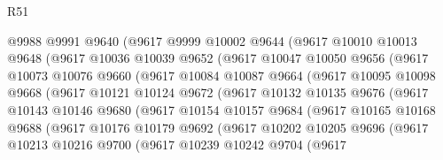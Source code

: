 \begin{lexlean}{R51}
\begin{coremodule}
                @9988
                @9991
                @9640
                (@9617
                  @9999
                  @10002
                  @9644
                  (@9617
                    @10010
                    @10013
                    @9648
                    (@9617
                      @10036
                      @10039
                      @9652
                      (@9617
                        @10047
                        @10050
                        @9656
                        (@9617
                          @10073
                          @10076
                          @9660
                          (@9617
                            @10084
                            @10087
                            @9664
                            (@9617
                              @10095
                              @10098
                              @9668
                              (@9617
                                @10121
                                @10124
                                @9672
                                (@9617
                                  @10132
                                  @10135
                                  @9676
                                  (@9617
                                    @10143
                                    @10146
                                    @9680
                                    (@9617
                                      @10154
                                      @10157
                                      @9684
                                      (@9617
                                        @10165
                                        @10168
                                        @9688
                                        (@9617
                                          @10176
                                          @10179
                                          @9692
                                          (@9617
                                            @10202
                                            @10205
                                            @9696
                                            (@9617
                                              @10213
                                              @10216
                                              @9700
                                              (@9617
                                                @10239
                                                @10242
                                                @9704
                                                (@9617

\end{coremodule}
\end{lexlean}
